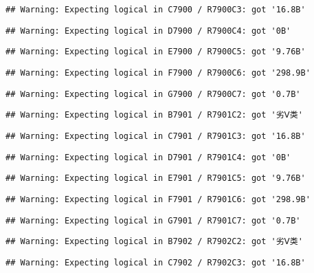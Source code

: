 \documentclass[
]{article}
\begin{document}
\begin{verbatim}
## Warning: Expecting logical in C7900 / R7900C3: got '16.8B'
\end{verbatim}

\begin{verbatim}
## Warning: Expecting logical in D7900 / R7900C4: got '0B'
\end{verbatim}

\begin{verbatim}
## Warning: Expecting logical in E7900 / R7900C5: got '9.76B'
\end{verbatim}

\begin{verbatim}
## Warning: Expecting logical in F7900 / R7900C6: got '298.9B'
\end{verbatim}

\begin{verbatim}
## Warning: Expecting logical in G7900 / R7900C7: got '0.7B'
\end{verbatim}

\begin{verbatim}
## Warning: Expecting logical in B7901 / R7901C2: got '劣Ⅴ类'
\end{verbatim}

\begin{verbatim}
## Warning: Expecting logical in C7901 / R7901C3: got '16.8B'
\end{verbatim}

\begin{verbatim}
## Warning: Expecting logical in D7901 / R7901C4: got '0B'
\end{verbatim}

\begin{verbatim}
## Warning: Expecting logical in E7901 / R7901C5: got '9.76B'
\end{verbatim}

\begin{verbatim}
## Warning: Expecting logical in F7901 / R7901C6: got '298.9B'
\end{verbatim}

\begin{verbatim}
## Warning: Expecting logical in G7901 / R7901C7: got '0.7B'
\end{verbatim}

\begin{verbatim}
## Warning: Expecting logical in B7902 / R7902C2: got '劣Ⅴ类'
\end{verbatim}

\begin{verbatim}
## Warning: Expecting logical in C7902 / R7902C3: got '16.8B'
\end{verbatim}
\end{document}
